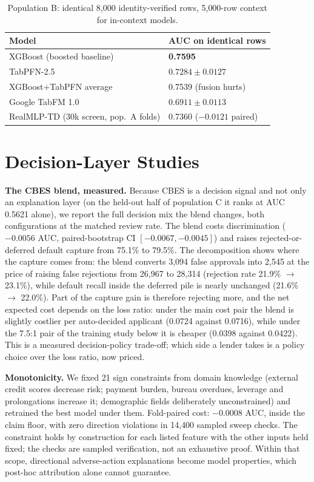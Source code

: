 \documentclass[conference]{IEEEtran}
\begin{document}
\begin{table}[t]
\centering
\caption{Population B: identical 8{,}000 identity-verified rows,
5{,}000-row context for in-context models.}
\label{tab:fm}
\begin{tabular}{@{}l l@{}}
\toprule
\textbf{Model} & \textbf{AUC on identical rows} \\
\midrule
XGBoost (boosted baseline) & \textbf{0.7595} \\
TabPFN-2.5~\cite{tabpfn25} & $0.7284 \pm 0.0127$ \\
XGBoost$+$TabPFN average & 0.7539 (fusion hurts) \\
Google TabFM 1.0~\cite{tabfm2026} & $0.6911 \pm 0.0113$ \\
\midrule
RealMLP-TD (30k screen, pop.\ A folds) & 0.7360 ($-0.0121$ paired) \\
\bottomrule
\end{tabular}
\end{table}

\section{Decision-Layer Studies}\label{sec:studies}
\textbf{The CBES blend, measured.} Because CBES is a decision signal and
not only an explanation layer (on the held-out half of population C it
ranks at AUC 0.5621 alone), we report the full decision mix the blend
changes, both configurations at the matched review rate. The blend costs
discrimination ($-0.0056$ AUC, paired-bootstrap CI $[-0.0067, -0.0045]$)
and raises rejected-or-deferred default capture from 75.1\% to 79.5\%. The
decomposition shows where the capture comes from: the blend converts
3{,}094 false approvals into 2{,}545 at the price of raising false
rejections from 26{,}967 to 28{,}314 (rejection rate 21.9\% $\to$ 23.1\%),
while default recall inside the deferred pile is nearly unchanged (21.6\%
$\to$ 22.0\%). Part of the capture gain is therefore rejecting more, and
the net expected cost depends on the loss ratio: under the main cost pair
the blend is slightly costlier per auto-decided applicant (0.0724 against
0.0716), while under the 7.5:1 pair of the training study below it is
cheaper (0.0398 against 0.0422). This is a measured decision-policy
trade-off; which side a lender takes is a policy choice over the loss
ratio, now priced.

\textbf{Monotonicity.} We fixed 21 sign constraints from domain knowledge
(external credit scores decrease risk; payment burden, bureau overdues,
leverage and prolongations increase it; demographic fields deliberately
unconstrained) and retrained the best model under them. Fold-paired cost:
$-0.0008$ AUC, inside the claim floor, with zero direction violations in
14{,}400 sampled sweep checks. The constraint holds by construction for
each listed feature with the other inputs held fixed; the checks are
sampled verification, not an exhaustive proof. Within that scope,
directional adverse-action explanations become model properties, which
post-hoc attribution alone cannot guarantee.
\end{document}

